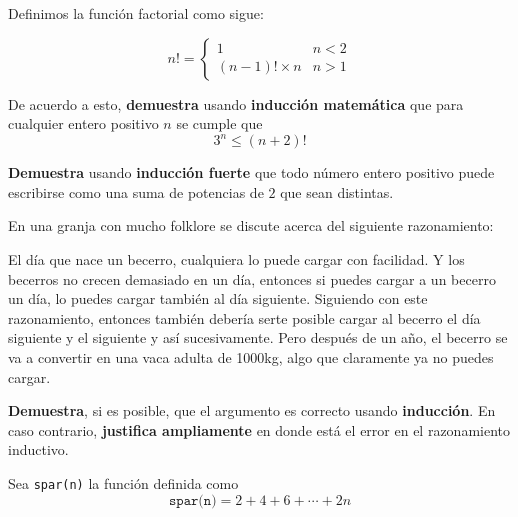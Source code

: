 \documentclass[oneside]{style}
\begin{document}
\begin{questions}[label=\protect\circled{\bfseries\arabic*}]
    \question
    {
        Definimos la función factorial como sigue:
        
        \[ 
            n! = 
            \begin{cases} 
                1 & n < 2 \\
                (n-1)! \times n & n > 1 
            \end{cases}
        \]      

        De acuerdo a esto, \textbf{demuestra} usando \textbf{inducción 
        matemática} que para cualquier entero positivo $n$ se cumple que 
        \begin{equation*}
            3^n \leq (n+2)!
        \end{equation*}
    }

    \question
    {
        \textbf{Demuestra} usando \textbf{inducción fuerte} que todo número 
        entero positivo puede escribirse como una suma de potencias de $2$ que 
        sean distintas. 
    }

    \question
    {
        En una granja con mucho folklore se discute acerca del siguiente 
        razonamiento: 
        \begin{tcolorbox}
            El día que nace un becerro, cualquiera lo puede cargar con 
            facilidad. Y los becerros no crecen demasiado en un día, entonces 
            si puedes cargar a un becerro un día, lo puedes cargar también al 
            día siguiente. Siguiendo con este razonamiento, entonces también 
            debería serte posible cargar al becerro el día siguiente y el 
            siguiente y así sucesivamente. Pero después de un año, el becerro 
            se va a convertir en una vaca adulta de 1000kg, algo que claramente 
            ya no puedes cargar.
        \end{tcolorbox}

        \textbf{Demuestra}, si es posible, que el argumento es correcto 
        usando \textbf{inducción}. En caso contrario, \textbf{justifica 
        ampliamente} en donde está el error en el razonamiento inductivo. 
    }

    \question
    {
        Sea \texttt{spar(n)} la función definida como 
        \begin{equation*}
            \texttt{spar(n)} = 2 + 4 + 6 + \cdots + 2n
        \end{equation*}

}
\end{questions}
\end{document}
